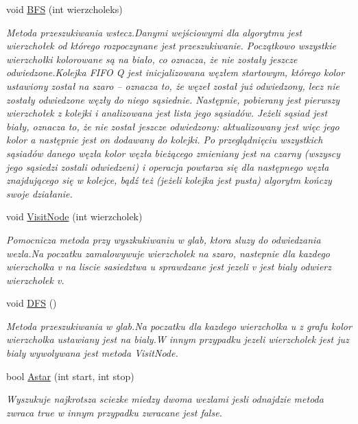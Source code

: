 \begin{DoxyCompactItemize}
void \hyperlink{class_graf_a48ef7dc699b09162388314e67cc6e150}{B\-F\-S} (int wierzcholeks)
\begin{DoxyCompactList}\small\item\em Metoda przeszukiwania wstecz.\-Danymi wejściowymi dla algorytmu jest wierzchołek od którego rozpoczynane jest przeszukiwanie. Początkowo wszystkie wierzchołki kolorowane są na biało, co oznacza, że nie zostały jeszcze odwiedzone.\-Kolejka F\-I\-F\-O Q jest inicjalizowana węzłem startowym, którego kolor ustawiony został na szaro – oznacza to, że węzeł został już odwiedzony, lecz nie zostały odwiedzone węzły do niego sąsiednie. Następnie, pobierany jest pierwszy wierzchołek z kolejki i analizowana jest lista jego sąsiadów. Jeżeli sąsiad jest biały, oznacza to, że nie został jeszcze odwiedzony\-: aktualizowany jest więc jego kolor a następnie jest on dodawany do kolejki. Po przeglądnięciu wszystkich sąsiadów danego węzła kolor węzła bieżącego zmieniany jest na czarny (wszyscy jego sąsiedzi zostali odwiedzeni) i operacja powtarza się dla następnego węzła znajdującego się w kolejce, bądź też (jeżeli kolejka jest pusta) algorytm kończy swoje działanie. \end{DoxyCompactList}\item 
void \hyperlink{class_graf_a8340cd1321426d1a49b5e50f1c7e10f1}{Visit\-Node} (int wierzcholek)
\begin{DoxyCompactList}\small\item\em Pomocnicza metoda przy wyszkukiwaniu w glab, ktora sluzy do odwiedzania wezla.\-Na poczatku zamalowywuje wierzcholek na szaro, nastepnie dla kazdego wierzcholka v na liscie sasiedztwa u sprawdzane jest jezeli v jest bialy odwierz wierzcholek v. \end{DoxyCompactList}\item 
void \hyperlink{class_graf_a8b40e6700dd8f1f71b6b47558c0975a1}{D\-F\-S} ()
\begin{DoxyCompactList}\small\item\em Metoda przeszukiwania w glab.\-Na poczatku dla kazdego wierzcholka u z grafu kolor wierzcholka ustawiany jest na bialy.\-W innym przypadku jezeli wierzcholek jest juz bialy wywolywana jest metoda Visit\-Node. \end{DoxyCompactList}\item 
bool \hyperlink{class_graf_abcd0560ed9789d1a6e2d9a60c1510352}{Astar} (int start, int stop)
\begin{DoxyCompactList}\small\item\em Wyszukuje najkrotsza sciezke miedzy dwoma wezlami jesli odnajdzie metoda zwraca true w innym przypadku zwracane jest false. \end{DoxyCompactList}\end{DoxyCompactItemize}
